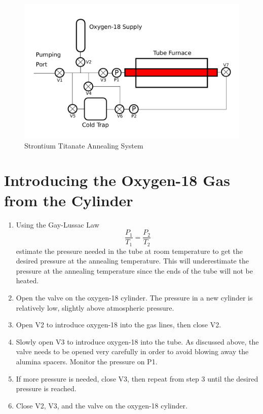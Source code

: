 \documentclass{thesis-umich}
\begin{document}
\begin{figure} \caption[Strontium Titanate Annealing System]{Strontium Titanate Annealing System} \includegraphics[width=\columnwidth]{figures/annealing_system.pdf} \end{figure}

\section{Introducing the Oxygen-18 Gas from the Cylinder}
\label{anneal:cyl}
\begin{enumerate}
	\item Using the Gay-Lussac Law \[ \frac{P_1}{T_1} = \frac{P_2}{T_2} \] estimate the pressure needed in the tube at room temperature to get the desired pressure at the annealing temperature. This will underestimate the pressure at the annealing temperature since the ends of the tube will not be heated.
	\item Open the valve on the oxygen-18 cylinder. The pressure in a new cylinder is relatively low, slightly above atmospheric pressure.
	\item Open V2 to introduce oxygen-18 into the gas lines, then close V2.
	\item Slowly open V3 to introduce oxygen-18 into the tube. As discussed above, the valve needs to be opened very carefully in order to avoid blowing away the alumina spacers. Monitor the pressure on P1.
	\item If more pressure is needed, close V3, then repeat from step 3 until the desired pressure is reached.
	\item Close V2, V3, and the valve on the oxygen-18 cylinder.
\end{enumerate}
\end{document}
